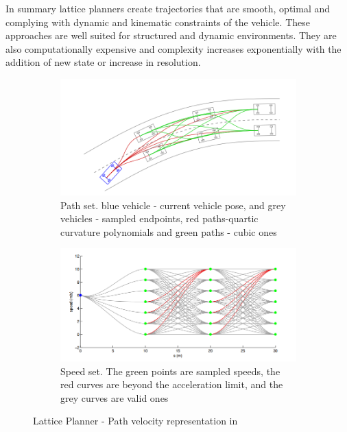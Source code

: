 In summary lattice planners create trajectories that are smooth, optimal and complying with dynamic and kinematic constraints of the vehicle. These approaches are well suited for structured and dynamic environments. They are also computationally expensive and complexity increases exponentially with the addition of new state or increase in resolution.

\begin{figure}
	\centering
	\begin{subfigure}{.52\textwidth}
		\centering
		\includegraphics[width=1.0\linewidth]{Images/related_work/traj_optim_1.png}
		\caption{Path set. blue vehicle - current vehicle pose, and grey vehicles - sampled endpoints, red paths-quartic curvature polynomials and green paths - cubic ones}
		\label{trajoptsub1}
	\end{subfigure}%
	\begin{subfigure}{.48\textwidth}
		\centering
		\includegraphics[width=1.0\linewidth]{Images/related_work/traj_optim_2.png}
		\caption{Speed set. The green points are sampled speeds, the
red curves are beyond the acceleration limit, and the grey
curves are valid ones}
		\label{trajoptsub2}
	\end{subfigure}
	\caption{Lattice Planner - Path velocity representation in \cite{traj_planner_optimization}}
	\label{trajopt}
\end{figure}

